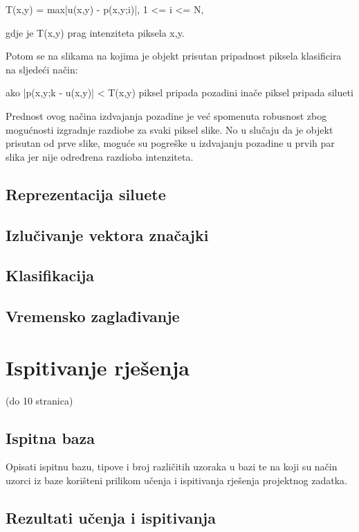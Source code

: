 \documentclass[times, utf8, diplomski]{fer}
\begin{document}
T(x,y) = max{|u(x,y) - p(x,y;i)|}, 1 <= i <= N,

gdje je T(x,y) prag intenziteta piksela x,y.

Potom se na slikama na kojima je objekt prisutan pripadnost piksela klasificira na sljedeći način:

  ako |p(x,y;k - u(x,y)| < T(x,y)
      piksel pripada pozadini
  inače\linebreak
      piksel pripada silueti
      
Prednost ovog načina izdvajanja pozadine je već spomenuta robusnost zbog mogućnosti izgradnje razdiobe za svaki piksel slike. No u slučaju da je objekt prisutan od prve slike, moguće su pogreške u izdvajanju pozadine u prvih par slika jer nije određrena razdioba intenziteta.


\section{Reprezentacija siluete}

\section{Izlučivanje vektora značajki}

\section{Klasifikacija}

\section{Vremensko zaglađivanje}

\chapter{Ispitivanje rješenja}

(do 10 stranica)

\section{Ispitna baza}

Opisati ispitnu bazu, tipove i broj različitih uzoraka u bazi te na koji su način uzorci iz baze korišteni prilikom učenja i ispitivanja rješenja projektnog zadatka. 

\section{Rezultati učenja i ispitivanja}
\end{document}
